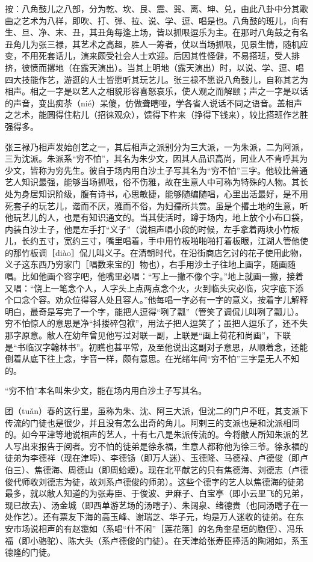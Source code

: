 \documentclass[12pt,UTF8]{ctexbook}
\begin{document}
按：八角鼓儿之八部，分为乾、坎、艮、震、巽、离、坤、兑，由此八卦中分其歌曲之艺术为八样，即吹、打、弹、拉、说、学、逗、唱是也。八角鼓的班儿，向有生、旦、净、末、丑，其丑角每逢上场，皆以抓哏逗乐为主。在那时八角鼓之有名丑角儿为张三禄，其艺术之高超，胜人一筹者，仗以当场抓哏，见景生情，随机应变，不用死套话儿，演来颇受社会人士欢迎。后因其性怪僻，不易搭班，受人排挤，彼愤而撂地（在露天演出）。当其上明地（露天演出）时，以说、学、逗、唱四大技能作艺，游逛的人士皆愿听其玩艺儿。张三禄不愿说八角鼓儿，自称其艺为相声。相之一字是以艺人之相貌形容喜怒哀乐，使人观之而解颐；声之一字是以话的声音，变出痴苶（nié）呆傻，仿做聋瞎哑，学各省人说话不同之语音。盖相声之艺术，能圆得住粘儿（招徕观众），馈得下杵来（挣得下钱来），较比搭班作艺胜强得多。

张三禄乃相声发始创艺之一，其后相声之派别分为三大派，一为朱派，二为阿派，三为沈派。朱派系“穷不怕”，其名为朱少文，因其人品识高尚，同业人不肯呼其为少文，皆称为穷先生。彼自于场内用白沙土子写其名为“穷不怕”三字。他较比普通艺人知识最强，能够当场抓哏，俗不伤雅，故在生意人中可称为特殊的人物。其长处为身居知识阶级，腹有诗书，心思敏捷，能够随编随唱，心里出活最好，是不用死套子的玩艺儿，谐而不厌，雅而不俗，为妇孺所共赏。虽是个撂土地的生意，听他玩艺儿的人，也是有知识通文的。当其使活时，蹲于场内，地上放个小布口袋，内装白沙土子，他是左手打“义子”（说相声唱小段的时候，左手拿着两块小竹板儿，长约五寸，宽约三寸，嘴里唱着，手中用竹板啪啪啪打着板眼，江湖人管他使的那竹板调［diào］侃儿叫义子。在清朝时代，在沿街商店乞讨的花子使用此物，义子这东西乃穷家门［唱数来宝的］物也），右手用沙土子往地上画字，随画随唱。比如他画个容字吧，他嘴里必唱：“写上一撇不像个字。”地上就画一撇，接着又唱：“饶上一笔念个人，人字头上点两点念个火，火到临头灾必临，灾字底下添个口念个容。劝众位得容人处且容人。”他每唱一字必有一字的意义，按着字儿解释明白，最奇是写完了一个字，能把人逗得“咧了瓢”（管笑了调侃儿叫咧了瓢儿）。穷不怕惊人的意思是净“抖搂碎包袱”，用法子把人逗笑了；虽把人逗乐了，还不失那字原意。敝人在幼年曾见他写过对联一副，上联是“画上荷花和尚画”，下联是“书临汉字翰林书”。初瞧也甚平常，及至他说出这副对子意思，从顺着念，还能倒着从底下往上念，字音一样，颇有意思。在光绪年间“穷不怕”三字是无人不知的。

“穷不怕”本名叫朱少文，能在场内用白沙土子写其名。



团（tuǎn）春的这行里，虽称为朱、沈、阿三大派，但沈二的门户不旺，其支派下传流的门徒也是很少，并且没有怎么出奇的角儿。阿剌三的支派也是和沈派相同的。如今平津等地说相声的艺人，十有七八是朱派传流的。今将敝人所知朱派的艺人写出来报告于阅者。穷不怕的徒弟是徐永福，生意人都称他为徐三爷。徐永福的徒弟为李德祥（现在津埠）、李德钖（即万人迷）、玉德隆、马德禄、卢德俊（即卢伯三）、焦德海、周德山（即周蛤蟆）。现在北平献艺的只有焦德海、刘德志（卢德俊代师收刘德志为徒，故刘系卢德俊的师弟）。这些个德字的艺人以焦德海的徒弟最多，就以敝人知道的为张寿臣、于俊波、尹麻子、白宝亭（即小云里飞的兄弟，现已故去）、汤金城（即西单游艺场的汤瞎子）、朱阔泉、绪德贵（也同汤瞎子在一处作艺）。还有票友下海的高玉峰、谢瑞芝、华子元，均是万人迷收的徒弟。在东安市场说相声的有赵霭如（系唱“什不闲”［莲花落］的名角奎星垣的胞侄）、冯乐福（即小骆驼）、陈大头（系卢德俊的门徒）。在天津给张寿臣捧活的陶湘如，系玉德隆的门徒。
\end{document}

